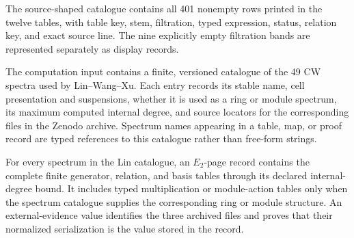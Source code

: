 \begin{definition}
  \label{def:appendix-row-catalogue}
  \leanok
  The source-shaped catalogue contains all 401 nonempty rows printed in the
  twelve tables, with table key, stem, filtration, typed expression, status,
  relation key, and exact source line.  The nine explicitly empty filtration
  bands are represented separately as display records.
\end{definition}

\begin{definition}
  \label{def:lin-spectrum-catalogue}
  \notready
  The computation input contains a finite, versioned catalogue of the 49 CW
  spectra used by Lin--Wang--Xu.  Each entry records its stable name, cell
  presentation and suspensions, whether it is used as a ring or module
  spectrum, its maximum computed internal degree, and source locators for the
  corresponding files in the Zenodo archive.  Spectrum names appearing in a
  table, map, or proof record are typed references to this catalogue rather
  than free-form strings.
\end{definition}

\begin{definition}
  \label{def:lin-e2-page-catalogue}
  \notready
  For every spectrum in the Lin catalogue, an $E_2$-page record contains the
  complete finite generator, relation, and basis tables through its declared
  internal-degree bound.  It includes typed multiplication or module-action
  tables only when the spectrum catalogue supplies the corresponding ring or
  module structure.  An external-evidence value identifies the three archived
  files and proves that their normalized serialization is the value stored in
  the record.
\end{definition}

